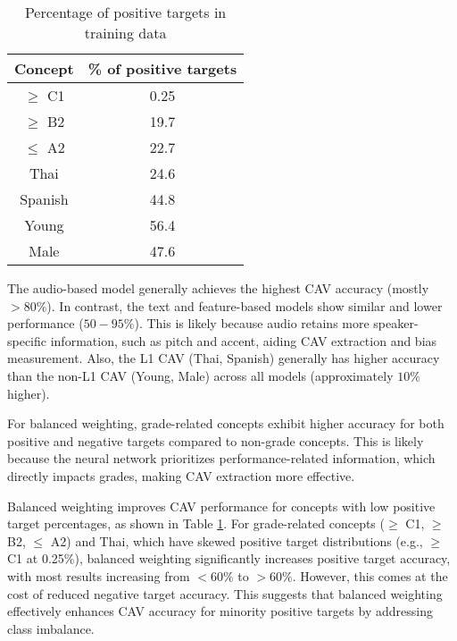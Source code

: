 \begin{table}[H]
    \centering
    \begin{tabular}{|c|c|}
        \hline
        \textbf{Concept} & \textbf{\% of positive targets} \\
        \hline
        $\geq$ C1        & 0.25                            \\
        $\geq$ B2        & 19.7                            \\
        $\leq$ A2        & 22.7                            \\ \hline
        Thai             & 24.6                            \\
        Spanish          & 44.8                            \\ \hline
        Young            & 56.4                            \\ \hline
        Male             & 47.6                            \\
        \hline
    \end{tabular}
    \caption{Percentage of positive targets in training data}
    \label{tab:pos_target}
\end{table}

The audio-based model generally achieves the highest CAV accuracy (mostly $> 80\%$). In contrast, the text and feature-based models show similar and lower performance ($50-95\%$). This is likely because audio retains more speaker-specific information, such as pitch and accent, aiding CAV extraction and bias measurement. Also, the L1 CAV (Thai, Spanish) generally has higher accuracy than the non-L1 CAV (Young, Male) across all models (approximately $10\%$ higher).

For balanced weighting, grade-related concepts exhibit higher accuracy for both positive and negative targets compared to non-grade concepts. This is likely because the neural network prioritizes performance-related information, which directly impacts grades, making CAV extraction more effective.

Balanced weighting improves CAV performance for concepts with low positive target percentages, as shown in Table \ref{tab:pos_target}. For grade-related concepts ($\geq$ C1, $\geq$ B2, $\leq$ A2) and Thai, which have skewed positive target distributions (e.g., $\geq$ C1 at 0.25\%), balanced weighting significantly increases positive target accuracy, with most results increasing from $< 60\%$ to $> 60\%$. However, this comes at the cost of reduced negative target accuracy. This suggests that balanced weighting effectively enhances CAV accuracy for minority positive targets by addressing class imbalance.

